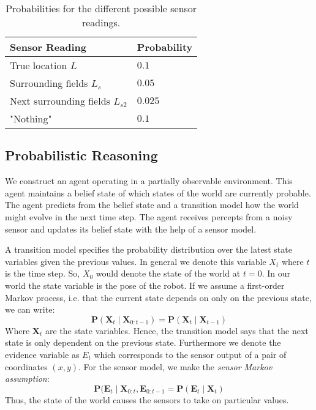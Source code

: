 \documentclass{article}
\begin{document}
\begin{table}[ht]
\centering
  \begin{tabular}{ | l | l | }
    \hline
    \textbf{Sensor Reading}             & \textbf{Probability}  \\ \hline
    True location $L$                   & $0.1$                 \\ \hline
    Surrounding fields $L_s$            & $0.05$                \\ \hline
    Next surrounding fields $L_{s2}$    & $0.025$               \\ \hline
    "Nothing"                           & $0.1$                 \\ \hline
  \end{tabular}
  \caption{Probabilities for the different possible sensor readings.}
  \label{tab:sensor}
\end{table}

\subsection{Probabilistic Reasoning}
We construct an agent operating in a partially observable environment. This agent maintains a belief state of which states of the world are currently probable. The agent predicts from the belief state and a transition model how the world might evolve in the next time step. The agent receives percepts from a noisy sensor and updates its belief state with the help of a sensor model.

A transition model specifies the probability distribution over the latest state variables given the previous values. In general we denote this variable $X_t$ where $t$ is the time step. So, $X_0$ would denote the state of the world at $t = 0$. In our world the state variable is the pose of the robot. If we assume a first-order Markov process, i.e. that the current state depends on only on the previous state, we can write: 
\begin{displaymath}
\textbf{P}(\textbf{X}_t \mid \textbf{X}_{0:t-1}) = \textbf{P}(\textbf{X}_t \mid \textbf{X}_{t-1})
\end{displaymath} Where $\textbf{X}_t$ are the state variables. Hence, the transition model says that the next state is only dependent on the previous state.
Furthermore we denote the evidence variable as $E_t$ which corresponds to the sensor output of a pair of coordinates $(x, y)$. For the sensor model, we make the \emph{sensor Markov assumption}:
\begin{displaymath}
\textbf{P}(\textbf{E}_t \mid \textbf{X}_{0:t}, \textbf{E}_{0:t-1} = \textbf{P}(\textbf{E}_t \mid \textbf{X}_t)
\end{displaymath} Thus, the state of the world causes the sensors to take on particular values.
\end{document}
